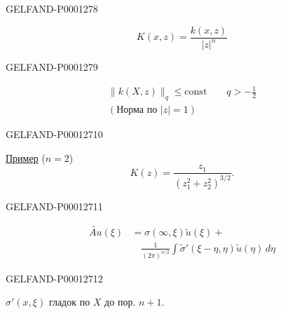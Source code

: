 \begin{GelfandAdjacentEvidence}{GELFAND-P000127}{8}

\begin{equation*}K(x,z)=\frac{k(x,z)}{|z|^n}\end{equation*}
\end{GelfandAdjacentEvidence}
\begin{GelfandAdjacentEvidence}{GELFAND-P000127}{9}

\begin{gather*}\|k(X,z)\|_q\le\mathrm{const}\qquad q> -\frac12\\(\text{Норма по }|z|=1)\end{gather*}
\end{GelfandAdjacentEvidence}
\begin{GelfandAdjacentEvidence}{GELFAND-P000127}{10}

\underline{Пример} ($n=2$)
\begin{equation*}K(z)=\frac{z_1}{(z_1^2+z_2^2)^{3/2}}.\end{equation*}
\end{GelfandAdjacentEvidence}
\begin{GelfandAdjacentEvidence}{GELFAND-P000127}{11}

\begin{equation*}\begin{aligned}
\widetilde{Au}(\xi)&=\sigma(\infty,\xi)\widetilde u(\xi)+{}\\
&\quad\frac1{(2\pi)^{n/2}}\int\widetilde\sigma'(\xi-\eta,\eta)\widetilde u(\eta)\,d\eta
\end{aligned}\end{equation*}
\end{GelfandAdjacentEvidence}
\begin{GelfandAdjacentEvidence}{GELFAND-P000127}{12}

$\sigma'(x,\xi)$ гладок по $X$ до пор. \underline{\underline{$n+1$}}.
\end{GelfandAdjacentEvidence}

